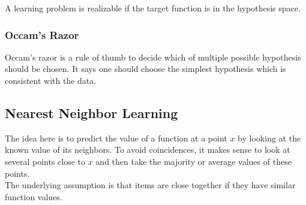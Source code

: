 \documentclass[english]{panikzettel}
\begin{document}
A learning problem is realizable if the target function is in the hypothesis space.


\subsubsection{Occam's Razor}
Occam's razor is a rule of thumb to decide which of multiple possible hypothesis should be chosen. It says one should choose the simplest hypothesis which is consistent with the data.


\subsection{Nearest Neighbor Learning}
The idea here is to predict the value of a function at a point $x$ by looking at the known value of its neighbors. To avoid coincidences, it makes sense to look at several points close to $x$ and then take the majority or average values of these points.\\
The underlying assumption is that items are close together if they have similar function values.
\end{document}
